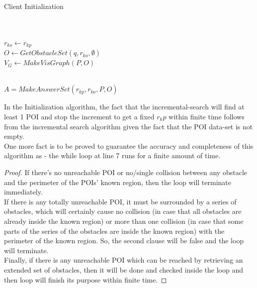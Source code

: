 \documentclass{sig-alternate}
\begin{document}
\begin{algorithm}
\caption{Client Initialization}
\label{ClientInit}
\begin{algorithmic}[2]

    \\
	\\ $r_{ko} \gets r_{kp} $
	\\ $O \gets GetObstacleSet(q, r_{ko}, \emptyset)$
	\\ $V_G \gets MakeVisGraph(P, O)$
	\\ 
	
	\\ \Return $A = MakeAnswerSet(r_{kp}, r_{ko}, P, O)$ 
\EndProcedure
\end{algorithmic}
\end{algorithm}


In the Initialization algorithm, the fact that the incremental-search will find at least 1 POI and stop the increment to get a fixed $r_kp$ within finite time follows from the incremental search algorithm given the fact that the POI data-set is not empty.
\\One more fact is to be proved to guarantee the accuracy and completeness of this algorithm as - the while loop at line 7 runs for a finite amount of time.

\begin{proof}
If there's no unreachable POI or no/single collision between any obstacle and the perimeter of the POIs' known region, then the loop will terminate immediately.
\\If there is any totally unreachable POI, it must be surrounded by a series of obstacles, which will certainly cause no collision (in case that all obstacles are already inside the known region) or more than one collision (in case that some parts of the series of the obstacles are inside the known region) with the perimeter of the known region. So, the second clause will be false and the loop will terminate.
\\Finally, if there is any unreachable POI which can be reached by retrieving an extended set of obstacles, then it will be done and checked inside the loop and then loop will finish its purpose within finite time.
\end{proof}
\end{document}
